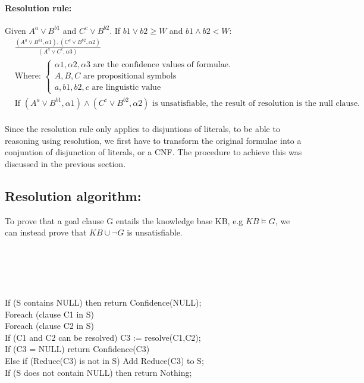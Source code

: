 \documentclass[part1.tex]{subfiles}
\begin{document}
\paragraph{Resolution rule:} Given \(A^a \vee B^{b1}\) and \(C^c \vee B^{b2}\). If \(b1 \vee b2 
\ge W\) and \(b1 \wedge b2 < W\):
\begin{align*}
	&\frac{(A^a \vee B^{b1}, {\alpha 1}), (C^c \vee B^{b2}, {\alpha 2})} {(A^a \vee C^c, {\alpha 3})}\\
	&\text{Where: }
	\begin{cases}
	\alpha 1, \alpha 2, \alpha 3 \text{ are the confidence
        values of formulae.}\\
	A, B, C \text{ are propositional symbols}\\
	a, b1, b2, c \text{ are linguistic value}
	\end{cases}
	\\
	&\text{If } (A^a \vee B^{b1}, {\alpha 1}) \wedge (C^c \vee B^{b2}, {\alpha 2}) \text{ is 
	unsatisfiable, the result of resolution is the null clause.} 
\end{align*}
\paragraph{} Since the resolution rule only applies to
disjuntions of literals, to be able to reasoning using
resolution, we first have to transform the original formulae into
a conjuntion of disjunction of literals, or a CNF.  The procedure
to achieve this was discussed in the previous section.\\

\subsection{Resolution algorithm:} 
 To prove that a goal clause G entails the knowledge base KB, e.g \(KB \models G\), we can instead prove
that \(KB \cup \neg G\) is unsatisfiable.\\\\
\\
\\\\
\\
\indent If (S contains NULL) then return Confidence(NULL);\\
\indent Foreach (clause C1 in S)\\
\indent \indent Foreach (clause C2 in S)\\
\indent \indent \indent If (C1 and C2 can be resolved) C3 := resolve(C1,C2);\\
\indent \indent \indent If (C3 = NULL) return Confidence(C3)\\
\indent \indent \indent \;\; Else if (Reduce(C3) is not in S) Add
Reduce(C3) to S;\\
\indent If (S does not contain NULL) then return Nothing;\\
\end{document}
